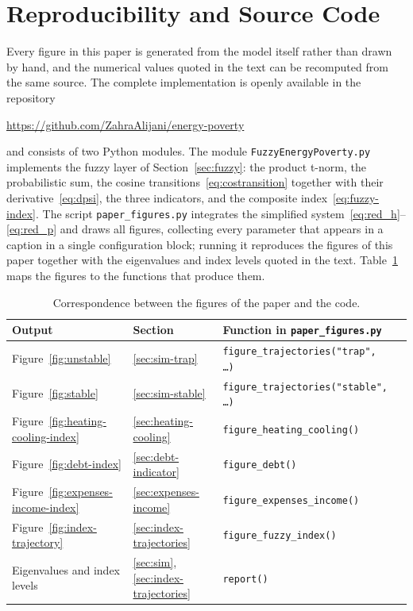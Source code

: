 \documentclass[11pt,a4paper]{article}
\newcommand{\codeurl}{https://github.com/ZahraAlijani/energy-poverty}
\begin{document}
\appendix
\section{Reproducibility and Source Code}\label{app:code}

Every figure in this paper is generated from the model itself rather than drawn
by hand, and the numerical values quoted in the text can be recomputed from the
same source. The complete implementation is openly available in the repository
\begin{center}
\url{\codeurl}
\end{center}
and consists of two Python modules. The module \texttt{FuzzyEnergyPoverty.py}
implements the fuzzy layer of Section~\ref{sec:fuzzy}: the product t-norm, the
probabilistic sum, the cosine transitions~\eqref{eq:costransition} together with
their derivative~\eqref{eq:dpsi}, the three indicators, and the composite
index~\eqref{eq:fuzzy-index}. The script \texttt{paper\_figures.py} integrates
the simplified system~\eqref{eq:red_h}--\eqref{eq:red_p} and draws all figures,
collecting every parameter that appears in a caption in a single configuration
block; running it reproduces the figures of this paper together with the
eigenvalues and index levels quoted in the text.
Table~\ref{tab:code-map} maps the figures to the functions that produce them.

\begin{table}[h!]
\centering
\small
\begin{tabular}{llll}
\toprule
\textbf{Output} & \textbf{Section} & \textbf{Function in \texttt{paper\_figures.py}} \\
\midrule
Figure~\ref{fig:unstable} & \ref{sec:sim-trap} & \texttt{figure\_trajectories("trap", \ldots)} \\
Figure~\ref{fig:stable} & \ref{sec:sim-stable} & \texttt{figure\_trajectories("stable", \ldots)} \\
Figure~\ref{fig:heating-cooling-index} & \ref{sec:heating-cooling} & \texttt{figure\_heating\_cooling()} \\
Figure~\ref{fig:debt-index} & \ref{sec:debt-indicator} & \texttt{figure\_debt()} \\
Figure~\ref{fig:expenses-income-index} & \ref{sec:expenses-income} & \texttt{figure\_expenses\_income()} \\
Figure~\ref{fig:index-trajectory} & \ref{sec:index-trajectories} & \texttt{figure\_fuzzy\_index()} \\
Eigenvalues and index levels & \ref{sec:sim}, \ref{sec:index-trajectories} & \texttt{report()} \\
\bottomrule
\end{tabular}
\caption{Correspondence between the figures of the paper and the code.}
\label{tab:code-map}
\end{table}
\end{document}
